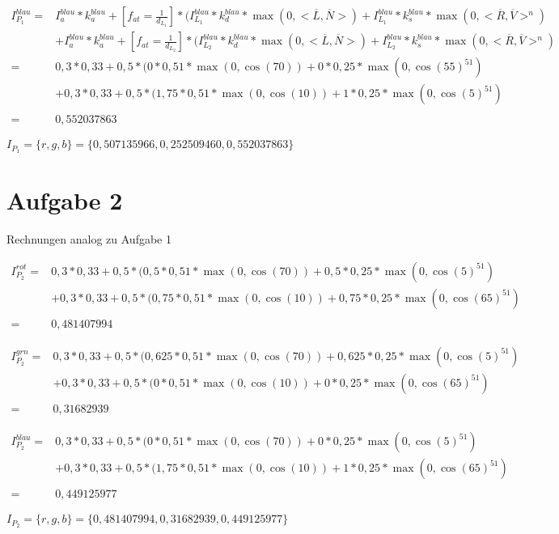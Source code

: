 \documentclass[10pt,a4paper,parskip=quarter ]{article}
\begin{document}
	\begin{align*}
	I^{blau}_{P_{1}} =& I^{blau}_{a}\ast k^{blau}_{a} + [f_{at} =\frac{1}{d_{L_{1}}}]\ast(I^{blau}_{L_{1}}\ast k^{blau}_{d}\ast \max(0,<\overline{L},\overline{N}>)+I^{blau}_{L_{1}}\ast k^{blau}_{s}\ast \max(0,<\overline{R},\overline{V}>^{n}) \\
	&+I^{blau}_{a}\ast k^{blau}_{a} + [f_{at} =\frac{1}{d_{L_{2}}}]\ast(I^{blau}_{L_{2}}\ast k^{blau}_{d}\ast \max(0,<\overline{L},\overline{N}>)+I^{blau}_{L_{2}}\ast k^{blau}_{s}\ast \max(0,<\overline{R},\overline{V}>^{n})\\
	=&0,3\ast0,33+0,5\ast(0\ast0,51\ast\max(0,\cos(70))+0\ast0,25\ast\max(0,\cos(55)^{51})	\\
	&+0,3\ast0,33+0,5\ast(1,75\ast0,51\ast\max(0,\cos(10))+1\ast0,25\ast\max(0,\cos(5)^{51})	\\	\\
	=& 0,552037863
	\end{align*}
	
	$I_{P_{1}} = \{r,g,b\} = \{0,507135966, 0,252509460, 0,552037863 \}$
	
	\newpage
	
	\section*{Aufgabe 2}
	
	Rechnungen analog zu Aufgabe 1
	
	\begin{align*}
	I^{rot}_{P_{2}} =&0,3\ast0,33+0,5\ast(0,5\ast0,51\ast\max(0,\cos(70))+0,5\ast0,25\ast\max(0,\cos(5)^{51})	\\
	&+0,3\ast0,33+0,5\ast(0,75\ast0,51\ast\max(0,\cos(10))+0,75\ast0,25\ast\max(0,\cos(65)^{51})	\\	\\
	=& 0,481407994
	\end{align*}
	
	\begin{align*}
	I^{grn}_{P_{2}}=&0,3\ast0,33+0,5\ast(0,625\ast0,51\ast\max(0,\cos(70))+0,625\ast0,25\ast\max(0,\cos(5)^{51})	\\
	&+0,3\ast0,33+0,5\ast(0\ast0,51\ast\max(0,\cos(10))+0\ast0,25\ast\max(0,\cos(65)^{51})	\\	\\
	=& 0,31682939
	\end{align*} 
	
	\begin{align*}
	I^{blau}_{P_{2}}=&0,3\ast0,33+0,5\ast(0\ast0,51\ast\max(0,\cos(70))+0\ast0,25\ast\max(0,\cos(5)^{51})	\\
	&+0,3\ast0,33+0,5\ast(1,75\ast0,51\ast\max(0,\cos(10))+1\ast0,25\ast\max(0,\cos(65)^{51})	\\	\\
	=& 0,449125977
	\end{align*}
	
	$I_{P_{2}} = \{r,g,b\} = \{0,481407994, 0,31682939, 0,449125977 \}$
	
\end{document}
